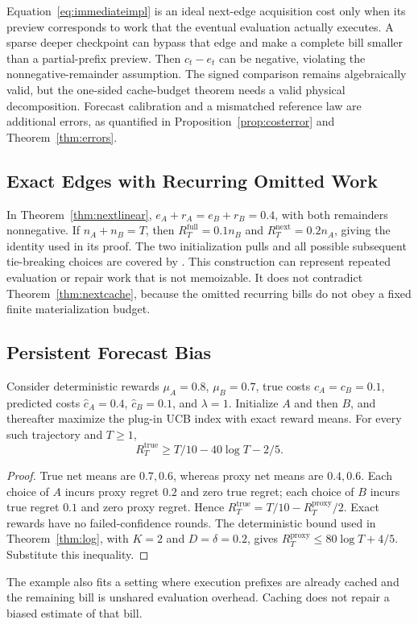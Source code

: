 Equation~\eqref{eq:immediateimpl} is an ideal next-edge acquisition cost only when its preview corresponds to work that the eventual evaluation actually executes. A sparse deeper checkpoint can bypass that edge and make a complete bill smaller than a partial-prefix preview. Then $c_t-e_t$ can be negative, violating the nonnegative-remainder assumption. The signed comparison remains algebraically valid, but the one-sided cache-budget theorem needs a valid physical decomposition. Forecast calibration and a mismatched reference law are additional errors, as quantified in Proposition~\ref{prop:costerror} and Theorem~\ref{thm:errors}.

\subsection{Exact Edges with Recurring Omitted Work}
In Theorem~\ref{thm:nextlinear}, $e_A+r_A=e_B+r_B=0.4$, with both remainders nonnegative. If $n_A+n_B=T$, then $R_T^{\mathrm{full}}=0.1n_B$ and $R_T^{\mathrm{next}}=0.2n_A$, giving the identity used in its proof. The two initialization pulls and all possible subsequent tie-breaking choices are covered by . This construction can represent repeated evaluation or repair work that is not memoizable. It does not contradict Theorem~\ref{thm:nextcache}, because the omitted recurring bills do not obey a fixed finite materialization budget.

\subsection{Persistent Forecast Bias}
\begin{theorem}
\label{thm:bias}
Consider deterministic rewards $\mu_A=0.8$, $\mu_B=0.7$, true costs $c_A=c_B=0.1$, predicted costs $\widehat c_A=0.4$, $\widehat c_B=0.1$, and $\lambda=1$. Initialize $A$ and then $B$, and thereafter maximize the plug-in UCB index with exact reward means. For every such trajectory and $T\ge1$,
\begin{equation}
R_T^{\mathrm{true}}\ge T/10-40\log T-2/5.
\label{eq:lower}
\end{equation}
\end{theorem}
\begin{proof}
True net means are $0.7,0.6$, whereas proxy net means are $0.4,0.6$. Each choice of $A$ incurs proxy regret $0.2$ and zero true regret; each choice of $B$ incurs true regret $0.1$ and zero proxy regret. Hence $R_T^{\mathrm{true}}=T/10-R_T^{\mathrm{proxy}}/2$. Exact rewards have no failed-confidence rounds. The deterministic bound used in Theorem~\ref{thm:log}, with $K=2$ and $D=\delta=0.2$, gives $R_T^{\mathrm{proxy}}\le80\log T+4/5$. Substitute this inequality.
\end{proof}

The example also fits a setting where execution prefixes are already cached and the remaining bill is unshared evaluation overhead. Caching does not repair a biased estimate of that bill.

